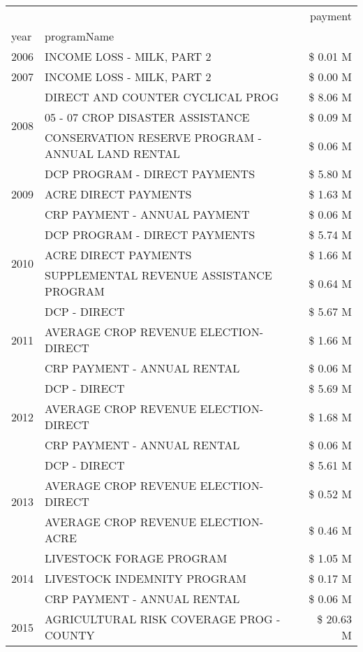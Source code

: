 \begin{tabular}{llr}
\toprule
 &  & payment \\
year & programName &  \\
\midrule
2006 & INCOME LOSS - MILK, PART 2 & \$ 0.01 M \\
\cline{1-3}
2007 & INCOME LOSS - MILK, PART 2 & \$ 0.00 M \\
\cline{1-3}
\multirow[t]{3}{*}{2008} & DIRECT AND COUNTER CYCLICAL PROG & \$ 8.06 M \\
 & 05 - 07 CROP DISASTER ASSISTANCE & \$ 0.09 M \\
 & CONSERVATION RESERVE PROGRAM - ANNUAL LAND RENTAL & \$ 0.06 M \\
\cline{1-3}
\multirow[t]{3}{*}{2009} & DCP PROGRAM - DIRECT PAYMENTS & \$ 5.80 M \\
 & ACRE DIRECT PAYMENTS & \$ 1.63 M \\
 & CRP PAYMENT - ANNUAL PAYMENT & \$ 0.06 M \\
\cline{1-3}
\multirow[t]{3}{*}{2010} & DCP PROGRAM - DIRECT PAYMENTS & \$ 5.74 M \\
 & ACRE DIRECT PAYMENTS & \$ 1.66 M \\
 & SUPPLEMENTAL REVENUE ASSISTANCE PROGRAM & \$ 0.64 M \\
\cline{1-3}
\multirow[t]{3}{*}{2011} & DCP - DIRECT & \$ 5.67 M \\
 & AVERAGE CROP REVENUE ELECTION-DIRECT & \$ 1.66 M \\
 & CRP PAYMENT - ANNUAL RENTAL & \$ 0.06 M \\
\cline{1-3}
\multirow[t]{3}{*}{2012} & DCP - DIRECT & \$ 5.69 M \\
 & AVERAGE CROP REVENUE ELECTION-DIRECT & \$ 1.68 M \\
 & CRP PAYMENT - ANNUAL RENTAL & \$ 0.06 M \\
\cline{1-3}
\multirow[t]{3}{*}{2013} & DCP - DIRECT & \$ 5.61 M \\
 & AVERAGE CROP REVENUE ELECTION-DIRECT & \$ 0.52 M \\
 & AVERAGE CROP REVENUE ELECTION-ACRE & \$ 0.46 M \\
\cline{1-3}
\multirow[t]{3}{*}{2014} & LIVESTOCK FORAGE PROGRAM & \$ 1.05 M \\
 & LIVESTOCK INDEMNITY PROGRAM & \$ 0.17 M \\
 & CRP PAYMENT - ANNUAL RENTAL & \$ 0.06 M \\
\cline{1-3}
\multirow[t]{3}{*}{2015} & AGRICULTURAL RISK COVERAGE PROG - COUNTY & \$ 20.63 M \\

\end{tabular}
